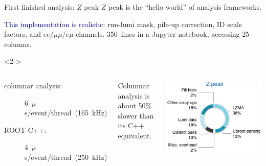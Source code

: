 \documentclass[aspectratio=169]{beamer}
\begin{document}
\begin{frame}[fragile]{First finished analysis: $Z$ peak}
\vspace{0.5 cm}
$Z$ peak is the ``hello world'' of analysis frameworks.

\vspace{0.5 cm}
\textcolor{darkblue}{This implementation is realistic:} run-lumi mask, pile-up correction, ID scale factors, and $ee$/$\mu\mu$/$e\mu$ channels. 350~lines in a Jupyter notebook, accessing 25 columns.

\vspace{0.25 cm}
\begin{uncoverenv}<2->
\begin{columns}
\large
\begin{description}
\item[columnar analysis:] \hfill \mbox{\hspace{-1 cm}6~$\mu$s/event/thread (165~kHz)}
\item[ROOT C++:] \hfill \mbox{\hspace{-1 cm}4~$\mu$s/event/thread (250~kHz)}
\end{description}

\vspace{0.25 cm}
Columnar analysis is about 50\% slower than its C++ equivalent.

\includegraphics[width=\linewidth]{zpeak-performance-breakdown.png}
\end{columns}
\end{uncoverenv}
\end{frame}
\end{document}
